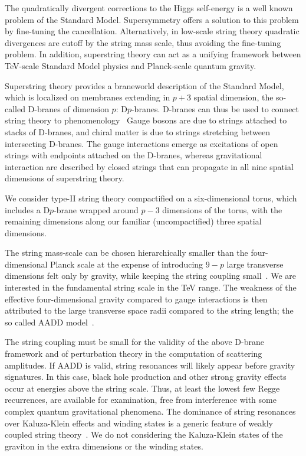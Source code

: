 The quadratically divergent corrections to the Higgs self-energy is a
well known problem of the Standard Model.
Supersymmetry offers a solution to this problem by fine-tuning the
cancellation. 
Alternatively, in low-scale string theory quadratic divergences are 
cutoff by the string mass scale, thus avoiding the fine-tuning problem.
In addition, superstring theory can act as a unifying framework between
TeV-scale Standard Model physics and Planck-scale quantum gravity.  

Superstring theory provides a braneworld description of the Standard
Model, which is localized on membranes extending in $p+3$ spatial
dimension, the so-called D-branes of dimension $p$: D$p$-branes.
D-branes can thus be used to connect string theory to
phenomenology~\cite{Antoniadis:2000ena,Cremades:2002qm,Antoniadis:2002qm}
Gauge bosons are due to strings attached to stacks of D-branes, and
chiral matter is due to strings stretching between intersecting D-branes.
The gauge interactions emerge as excitations of open strings with endpoints
attached on the D-branes, whereas gravitational interaction are described
by closed strings that can propagate in all nine spatial dimensions of
superstring theory.

We consider type-II string theory compactified on a six-dimensional
torus, which includes a D$p$-brane wrapped around $p-3$ dimensions of the
torus, with the remaining dimensions along our familiar (uncompactified)
three spatial dimensions.

The string mass-scale \Ms can be chosen hierarchically smaller than the
four-dimensional Planck scale at the expense of introducing $9-p$ large
transverse dimensions felt only by gravity, while keeping the string
coupling small~\cite{Cullen:2000ef}.
We are interested in the fundamental string scale in the TeV range.
The weakness of the effective four-dimensional gravity compared to gauge
interactions is then attributed to the large transverse space radii
compared to the string length; the so called AADD
model~\cite{ArkaniHamed:1998rs,Antoniadis:1998ig}. 

The string coupling must be small for the validity of the above D-brane
framework and of perturbation theory in the computation of scattering
amplitudes. 
If AADD is valid, string resonances will likely appear before gravity
signatures.
In this case, black hole production and other strong gravity effects
occur at energies above the string scale.
Thus, at least the lowest few Regge recurrences, are available for
examination, free from interference with some complex quantum
gravitational phenomena. 
The dominance of string resonances over Kaluza-Klein effects and winding
states is a generic feature of weakly coupled string
theory~\cite{Cullen:2000ef}. 
We do not considering the Kaluza-Klein states of the graviton in the
extra dimensions or the winding states.

